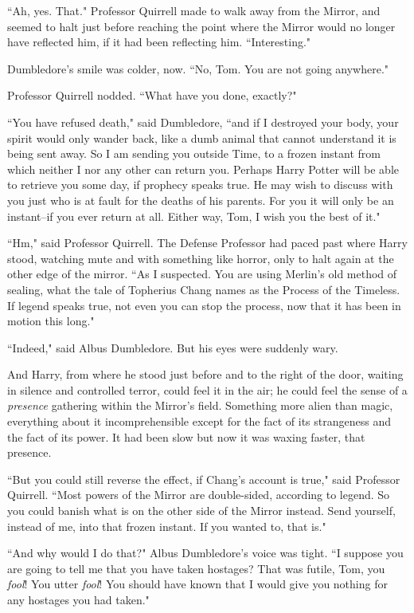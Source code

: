 ``Ah, yes. That." Professor Quirrell made to walk away from the Mirror, and seemed to halt just before reaching the point where the Mirror would no longer have reflected him, if it had been reflecting him. ``Interesting."

Dumbledore's smile was colder, now. ``No, Tom. You are not going anywhere."

Professor Quirrell nodded. ``What have you done, exactly?"

``You have refused death," said Dumbledore, ``and if I destroyed your body, your spirit would only wander back, like a dumb animal that cannot understand it is being sent away. So I am sending you outside Time, to a frozen instant from which neither I nor any other can return you. Perhaps Harry Potter will be able to retrieve you some day, if prophecy speaks true. He may wish to discuss with you just who is at fault for the deaths of his parents. For you it will only be an instant\---if you ever return at all. Either way, Tom, I wish you the best of it."

``Hm," said Professor Quirrell. The Defense Professor had paced past where Harry stood, watching mute and with something like horror, only to halt again at the other edge of the mirror. ``As I suspected. You are using Merlin's old method of sealing, what the tale of Topherius Chang names as the Process of the Timeless. If legend speaks true, not even you can stop the process, now that it has been in motion this long."

``Indeed," said Albus Dumbledore. But his eyes were suddenly wary.

And Harry, from where he stood just before and to the right of the door, waiting in silence and controlled terror, could feel it in the air; he could feel the sense of a \emph{presence} gathering within the Mirror's field. Something more alien than magic, everything about it incomprehensible except for the fact of its strangeness and the fact of its power. It had been slow but now it was waxing faster, that presence.

``But you could still reverse the effect, if Chang's account is true," said Professor Quirrell. ``Most powers of the Mirror are double-sided, according to legend. So you could banish what is on the other side of the Mirror instead. Send yourself, instead of me, into that frozen instant. If you wanted to, that is."

``And why would I do that?" Albus Dumbledore's voice was tight. ``I suppose you are going to tell me that you have taken hostages? That was futile, Tom, you \emph{fool}! You utter \emph{fool}! You should have known that I would give you nothing for any hostages you had taken."

